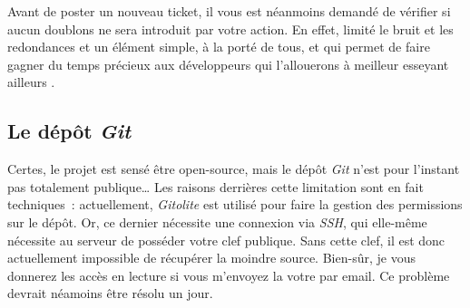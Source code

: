 Avant de poster un nouveau ticket, il vous est néanmoins demandé de vérifier si aucun doublons ne sera introduit par votre action.
En effet, limité le bruit et les redondances et un élément simple, à la porté de tous, et qui permet de faire gagner du temps précieux aux développeurs qui l'allouerons à meilleur esseyant ailleurs \smiley.

\subsection{Le dépôt \emph{Git}}
Certes, le projet est sensé être open-source, mais le dépôt \emph{Git} n'est pour l'instant pas totalement publique\dots{}
Les raisons derrières cette limitation sont en fait techniques~: actuellement, \emph{Gitolite} est utilisé pour faire la gestion des permissions sur le dépôt.
Or, ce dernier nécessite une connexion via \emph{SSH}, qui elle-même nécessite au serveur de posséder votre clef publique.
Sans cette clef, il est donc actuellement impossible de récupérer la moindre source.
Bien-sûr, je vous donnerez les accès en lecture si vous m'envoyez la votre par email.
Ce problème devrait néamoins être résolu un jour.
